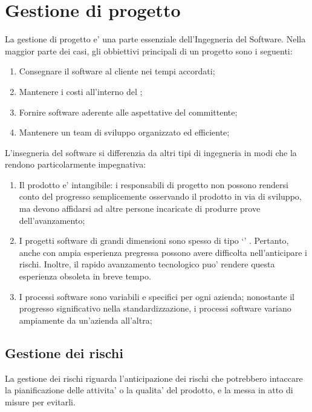 \section{Gestione di progetto}

La gestione di progetto e' una parte essenziale dell'Ingegneria del Software.
Nella maggior parte dei casi, gli obbiettivi principali di un progetto sono i
seguenti:

\begin{enumerate}
  \item Consegnare il software al cliente nei tempi accordati;
  \item Mantenere i costi all'interno del ;
  \item Fornire software aderente alle aspettative del committente;
  \item Mantenere un team di sviluppo organizzato ed efficiente;
\end{enumerate}

L'insegneria del software si differenzia da altri tipi di ingegneria in modi che
la rendono particolarmente impegnativa:

\begin{enumerate}
  \item Il prodotto e' intangibile: i responsabili di progetto non possono
    rendersi conto del progresso semplicemente osservando il prodotto in via di
    sviluppo, ma devono affidarsi ad altre persone incaricate di produrre prove
    dell'avanzamento;
  \item I progetti software di grandi dimensioni sono spesso di tipo
    `' . Pertanto, anche
     con ampia esperienza pregressa possono avere
    difficolta nell'anticipare i rischi. Inoltre, il rapido avanzamento
    tecnologico puo' rendere questa esperienza obsoleta in breve tempo.
  \item I processi software sono variabili e specifici per ogni azienda;
    nonostante il progresso significativo nella standardizzazione, i processi
    software variano ampiamente da un'azienda all'altra;
\end{enumerate}

\subsection{Gestione dei rischi}

La gestione dei rischi riguarda l'anticipazione dei rischi che potrebbero
intaccare la pianificazione delle attivita' o la qualita' del prodotto, e la
messa in atto di misure per evitarli.

